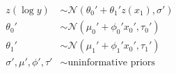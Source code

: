 \documentclass[varwidth=\linewidth]{standalone}
\begin{document}
$$\begin{aligned}
z(\log y) &\sim \mathcal{N}(\theta_0' + \theta_1' z(x_1), \sigma') \\
\theta_0' &\sim \mathcal{N}(\mu_0' + \phi_0' x_0', \tau_0') \\
\theta_1' &\sim \mathcal{N}(\mu_1' + \phi_1' x_0', \tau_1') \\
\sigma', \mu', \phi', \tau' &\sim \textrm{uninformative priors} \\
\end{aligned}$$
\end{document}
